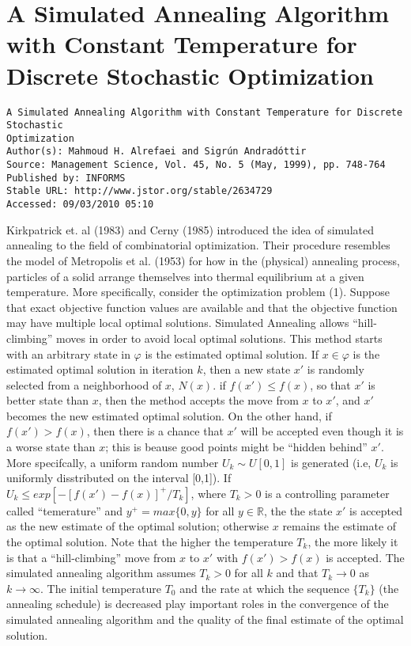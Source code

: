 \documentclass[pdftex,11pt]{article}
\begin{document}
\section*{A Simulated Annealing Algorithm with Constant Temperature for Discrete Stochastic Optimization}
\begin{verbatim}
A Simulated Annealing Algorithm with Constant Temperature for Discrete Stochastic
Optimization
Author(s): Mahmoud H. Alrefaei and Sigrún Andradóttir
Source: Management Science, Vol. 45, No. 5 (May, 1999), pp. 748-764
Published by: INFORMS
Stable URL: http://www.jstor.org/stable/2634729
Accessed: 09/03/2010 05:10
\end{verbatim}

Kirkpatrick et. al (1983) and Cerny (1985) introduced the idea of simulated annealing to the field of combinatorial optimization. Their procedure resembles the model of Metropolis et al. (1953) for how in the (physical) annealing process, particles of a solid arrange themselves into thermal equilibrium at a given temperature. More specifically, consider the optimization problem (1). Suppose that exact objective function values are available and that the objective function may have multiple local optimal solutions. Simulated Annealing allows ``hill-climbing'' moves in order to avoid local optimal solutions. This method starts with an arbitrary state in $\varphi$ is the estimated optimal solution. If $x \in \varphi$ is the estimated optimal solution in iteration $k$, then a new state $x'$ is randomly selected from a neighborhood of $x$, $N(x)$. if $f(x') \leq f(x)$, so that $x'$ is better state than $x$, then the method accepts the move from $x$ to $x'$, and $x'$ becomes the new estimated optimal solution. On the other hand, if $f(x') > f(x)$, then there is a chance that $x'$ will be accepted even though it is a worse state than $x$; this is beause good points might be ``hidden behind'' $x'$. More specifcally, a uniform random number $U_k \sim U[0,1]$ is generated (i.e, $U_k$ is uniformly disstributed on the interval [0,1]). If $U_k \leq exp[-[f(x') - f(x)]^+ / T_k]$, where $T_k > 0$ is a controlling parameter called ``temerature'' and $y^+ = max\{0,y\}$ for all $y \in \mathbb{R}$, the the state $x'$ is accepted as the new estimate of the optimal solution; otherwise $x$ remains the estimate of the optimal solution. Note that the higher the temperature $T_k$, the more likely it is that a ``hill-climbing'' move from $x$ to $x'$ with $f(x') > f(x)$ is accepted. The simulated annealing algorithm assumes $T_k > 0$ for all $k$ and that $T_k \rightarrow 0$ as $k \rightarrow \infty$. The initial temperature $T_0$ and the rate at which the sequence $\{T_k\}$ (the annealing schedule) is decreased play important roles in the convergence of the simulated annealing algorithm and the quality of the final estimate of the optimal solution.
\end{document}
